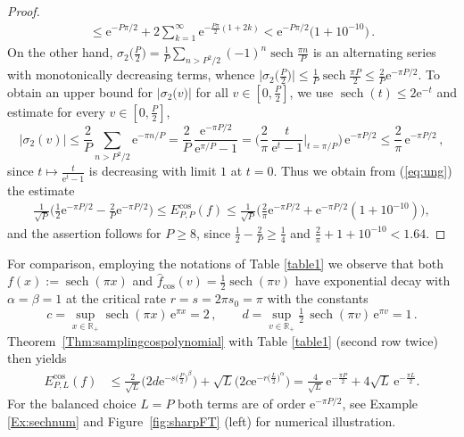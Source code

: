 \documentclass[11pt,a4paper]{scrartcl}
\numberwithin{equation}{section}
\numberwithin{table}{section}
\numberwithin{figure}{section}
\newcommand{\e}{\mathrm e}
\newcommand{\Rp}{{\mathbb R}_{+}}
\newcommand{\fcos}{{\hat f}_{\cos}}
\newcommand{\Ecos}{E^{\cos}}
\begin{document}
\begin{proof}
\begin{align*}
 \le  \e^{-P\pi/2} + 2 \sum\limits_{k=1}^\infty \e^{-\frac{P\pi}{2}(1+2k)}
 < \e^{-P\pi/2} \big(1 + 10^{-10}\big)\,.
 \end{align*}
On the other hand, $\sigma_2\big(\tfrac P2\big) = \frac1P\sum_{n>P^2/2}(-1)^n\operatorname{sech}\tfrac{\pi n}{P}$
is an alternating series with monotonically decreasing terms, whence
$\big|\sigma_2\big(\tfrac P2\big)\big| \le \tfrac1P\operatorname{sech}\tfrac{\pi P}{2} \le \tfrac2P\e^{-\pi P/2}$.
 To obtain an upper bound for $\big|\sigma_2\big(v\big)\big|$ for all $v \in [0,\frac P2]$, we use
$\operatorname{sech}(t) \le 2\e^{-t}$ and estimate for every $v \in [0,\frac P2]$,
$$
\textstyle |\sigma_2(v)| \le \frac2P \sum\limits_{n>P^2/2}\e^{-\pi n/P}
= \frac{2}{P}\,\frac{\e^{-\pi P/2}}{\e^{\pi/P}-1}
= \Big( \frac{2}{\pi}\,\frac{t}{\e^{t}-1}\Big|_{t = \pi/P} \Big) \, \e^{-\pi P/2}
\le \frac{2}{\pi}\,\e^{-\pi P/2}\,,
$$
since $t \mapsto \frac{t}{\e^t-1}$ is decreasing with limit $1$ at $t=0$.
Thus we obtain from (\ref{eq:ung}) the estimate
\begin{align*}
 \textstyle
\frac{1}{\sqrt{P}} \big( \frac{1}{2} \e^{-\pi P/2}  -  \frac{2}{P} \e^{-\pi P/2} \big) \le   \Ecos_{P,P}(f)
\le   \frac{1}{\sqrt{P}}  \big( \tfrac{2}{\pi} \e^{-\pi P/2} + \e^{-\pi P/2} (1 + 10^{-10}) \big),
\end{align*}
and the assertion follows for $P\ge 8$, since $\frac12 - \frac2P \ge \frac14$ and
$\frac2\pi + 1 + 10^{-10} < 1.64$.
\end{proof}

For comparison,  employing  the notations of Table \ref{table1} we observe that
	both $f(x) := \operatorname{sech}(\pi x)$ and $\fcos(v)= \frac{1}{2}\operatorname{sech}(\pi v)$ have exponential decay with $\alpha = \beta = 1$ at the
	critical rate $r = s = 2\pi s_0 = \pi$ with the constants
	$$
	c = \sup_{x\in\Rp} \operatorname{sech}(\pi x)\,\e^{\pi x} = 2\,, \qquad
	d = \sup_{v\in\Rp} \tfrac12\,\operatorname{sech}(\pi v)\,\e^{\pi v} = 1\,.
	$$
	Theorem~\ref{Thm:samplingcospolynomial} with Table \ref{table1} (second row twice)  then yields
	\begin{align}
		\label{eq:sechbound}
		\textstyle \Ecos_{P,L}(f) &\leq  \textstyle \frac{2}{\sqrt{L}} \big(2d \e^{-s \big(\frac{P}{2}\big)^{\beta}}\big)
		+ \sqrt{L} \big( 2c \e^{-r \big(\frac{L}{2}\big)^{\alpha}}\big)
		=   \textstyle \frac{4}{\sqrt{L}} \, \e^{-\frac{\pi P}{2}}
		+ 4\sqrt{L} \,  \e^{- \frac{\pi L}{2}}.
	\end{align}
	For the balanced choice $L = P$ both terms are of order $\e^{-\pi P/2}$, see Example \ref{Ex:sechnum} and
	Figure~\ref{fig:sharpFT} (left) for numerical illustration.
\end{document}

